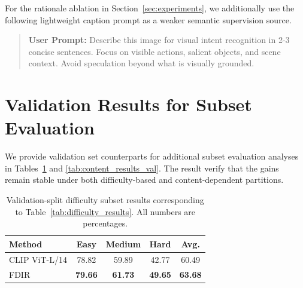 For the rationale ablation in Section~\ref{sec:experiments}, we additionally use the following lightweight caption prompt as a weaker semantic supervision source.

\begin{quote}

    \textbf{User Prompt:} Describe this image for visual intent recognition in 2-3 concise sentences. Focus on visible actions, salient objects, and scene context. Avoid speculation beyond what is visually grounded.
\end{quote}




\section{Validation Results for Subset Evaluation}
\label{app:validation_results_subsets}

We provide validation set counterparts for additional subset evaluation analyses in Tables~\ref{tab:difficulty_results_val} and \ref{tab:content_results_val}.
The result verify that the gains remain stable under both difficulty-based and content-dependent partitions.

\begin{table}[H]
\centering
\caption{Validation-split difficulty subset results corresponding to Table~\ref{tab:difficulty_results}. All numbers are percentages.}
\label{tab:difficulty_results_val}
\begin{tabular}{lcccc}
\hline
Method & Easy & Medium & Hard & Avg. \\
\hline
CLIP ViT-L/14 \cite{radford_learning_2021} & 78.82 & 59.89 & 42.77 & 60.49 \\
FDIR & \textbf{79.66} & \textbf{61.73} & \textbf{49.65} & \textbf{63.68} \\
\hline
\end{tabular}
\end{table}

